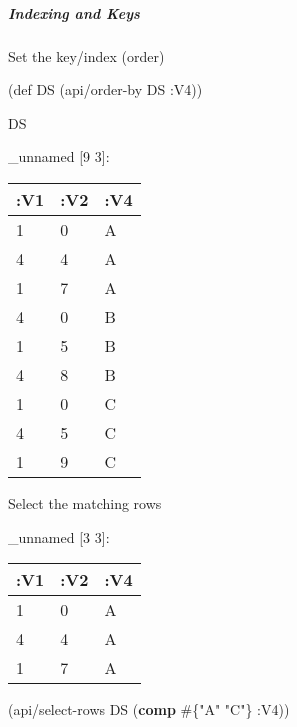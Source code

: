 \documentclass[]{article}
\newenvironment{Shaded}{\begin{snugshade}}{\end{snugshade}}
\newcommand{\KeywordTok}[1]{\textcolor[rgb]{0.13,0.29,0.53}{\textbf{#1}}}
\newcommand{\StringTok}[1]{\textcolor[rgb]{0.31,0.60,0.02}{#1}}
\newcommand{\FunctionTok}[1]{\textcolor[rgb]{0.00,0.00,0.00}{#1}}
\newcommand{\VariableTok}[1]{\textcolor[rgb]{0.00,0.00,0.00}{#1}}
\newcommand{\BuiltInTok}[1]{#1}
\newcommand{\AttributeTok}[1]{\textcolor[rgb]{0.77,0.63,0.00}{#1}}
\newcommand{\NormalTok}[1]{#1}
\let\oldsubparagraph\subparagraph
\renewcommand{\subparagraph}[1]{\oldsubparagraph{#1}\mbox{}}
\begin{document}
\subparagraph{Indexing and Keys}\label{indexing-and-keys}

Set the key/index (order)

\begin{Shaded}
\begin{Highlighting}[]
\NormalTok{(}\BuiltInTok{def}\FunctionTok{ DS }\NormalTok{(api/order-by DS }\AttributeTok{:V4}\NormalTok{))}
\end{Highlighting}
\end{Shaded}

\begin{Shaded}
\begin{Highlighting}[]
\NormalTok{DS}
\end{Highlighting}
\end{Shaded}

\_unnamed {[}9 3{]}:

\begin{longtable}[]{@{}lll@{}}
\toprule
:V1 & :V2 & :V4\tabularnewline
\midrule
\endhead
1 & 0 & A\tabularnewline
4 & 4 & A\tabularnewline
1 & 7 & A\tabularnewline
4 & 0 & B\tabularnewline
1 & 5 & B\tabularnewline
4 & 8 & B\tabularnewline
1 & 0 & C\tabularnewline
4 & 5 & C\tabularnewline
1 & 9 & C\tabularnewline
\bottomrule
\end{longtable}

Select the matching rows

\begin{Shaded}
\end{Shaded}

\_unnamed {[}3 3{]}:

\begin{longtable}[]{@{}lll@{}}
\toprule
:V1 & :V2 & :V4\tabularnewline
\midrule
\endhead
1 & 0 & A\tabularnewline
4 & 4 & A\tabularnewline
1 & 7 & A\tabularnewline
\bottomrule
\end{longtable}

\begin{Shaded}
\begin{Highlighting}[]
\NormalTok{(api/select-rows DS (}\KeywordTok{comp}\NormalTok{ #\{}\StringTok{"A"} \StringTok{"C"}\NormalTok{\} }\AttributeTok{:V4}\NormalTok{))}
\end{Highlighting}
\end{Shaded}
\end{document}
